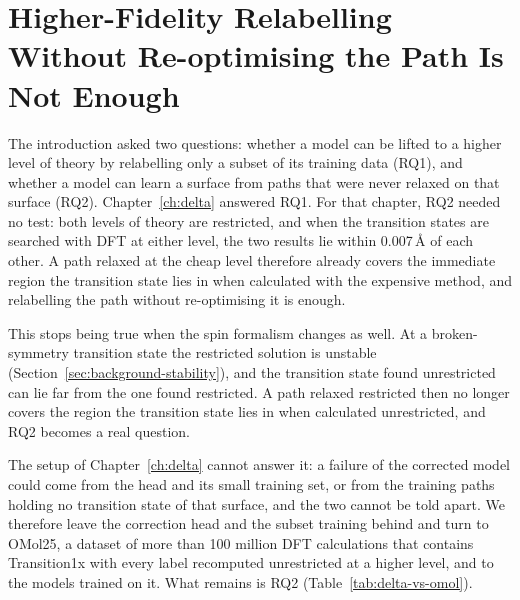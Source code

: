 %
%

\chapter{Higher-Fidelity Relabelling Without Re-optimising the Path Is Not Enough}
\label{ch:mr}

The introduction asked two questions: whether a model can be lifted
to a higher level of theory by relabelling only a subset of its
training data (RQ1), and whether a model can learn a surface from
paths that were never relaxed on that surface (RQ2).
Chapter~\ref{ch:delta} answered RQ1. For that chapter, RQ2 needed no
test: both levels of theory are restricted, and when the transition
states are searched with DFT at either level, the two results lie
within 0.007\,\AA{} of each other. A path relaxed at the cheap level
therefore already covers the immediate region the transition state
lies in when calculated with the expensive method, and relabelling the
path without re-optimising it is enough.

This stops being true when the spin formalism changes as well. At a
broken-symmetry transition state the restricted solution is unstable
(Section~\ref{sec:background-stability}), and the transition
state found unrestricted can lie far from the one found restricted. A path
relaxed restricted then no longer covers the region the transition
state lies in when calculated unrestricted, and RQ2 becomes a real
question.

The setup of Chapter~\ref{ch:delta} cannot answer it: a failure of
the corrected model could come from the head and its small training
set, or from the training paths holding no transition state of that
surface, and the two cannot be told apart. We therefore leave the
correction head and the subset training behind and turn to OMol25, a
dataset of more than 100 million DFT calculations that contains
Transition1x with every label recomputed unrestricted at a higher
level, and to the models trained on it. What remains is RQ2
(Table~\ref{tab:delta-vs-omol}).

